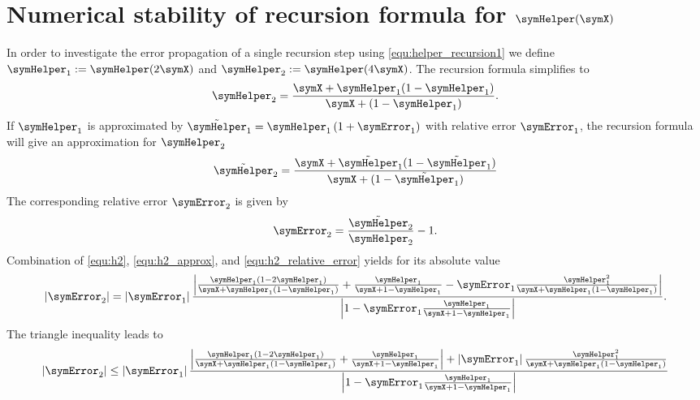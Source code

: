 \documentclass[a4paper]{scrartcl}
\begin{document}
\section{Numerical stability of recursion formula for $\symHelper(\symX)$}
\label{app:helper_stable}
In order to investigate the error propagation of a single recursion step using \eqref{equ:helper_recursion1} we define $\symHelper_1 := \symHelper(2\symX)$ and $\symHelper_2 := \symHelper(4\symX)$. The recursion formula simplifies to
\begin{equation}
\label{equ:h2}
\symHelper_2 = \frac{\symX+\symHelper_1(1-\symHelper_1)}{\symX+(1-\symHelper_1)}.
\end{equation}
If $\symHelper_1$ is approximated by $\tilde{\symHelper}_1 = \symHelper_1\left(1+\symError_1\right)$ with relative error $\symError_1$, the recursion formula will give an approximation for $\symHelper_2$
\begin{equation}
\label{equ:h2_approx}
\tilde{\symHelper}_2 = 
\frac{\symX+\tilde{\symHelper}_1(1-\tilde{\symHelper}_1)}{\symX+(1-\tilde{\symHelper}_1)}
\end{equation}
The corresponding relative error $\symError_2$ is given by
\begin{equation}
\label{equ:h2_relative_error}
\symError_2 = \frac{\tilde{\symHelper}_2}{\symHelper_2}-1.
\end{equation}
Combination of \eqref{equ:h2}, \eqref{equ:h2_approx}, and \eqref{equ:h2_relative_error} yields for its absolute value
\begin{equation}
\left|\symError_2\right|
=
\left|\symError_1\right|
\frac{
\left|
\frac{\symHelper_1\left(1-2\symHelper_1\right)}{\symX+\symHelper_1\left(1-\symHelper_1\right)}
+
\frac{\symHelper_1}{\symX+1-\symHelper_1}
-
\symError_1
\frac{\symHelper_1^2}{\symX+\symHelper_1\left(1-\symHelper_1\right)}
\right|
}{
\left|
1-
\symError_1
\frac{\symHelper_1}{\symX+1-\symHelper_1}
\right|
}.
\end{equation}
The triangle inequality leads to
\begin{equation}
\left|\symError_2\right|
\leq
\left|\symError_1\right|
\frac{
\left|
\frac{\symHelper_1\left(1-2\symHelper_1\right)}{\symX+\symHelper_1\left(1-\symHelper_1\right)}
+
\frac{\symHelper_1}{\symX+1-\symHelper_1}
\right|
+
\left|
\symError_1
\right|
\frac{\symHelper_1^2}{\symX+\symHelper_1\left(1-\symHelper_1\right)}
}{
\left|
1-
\symError_1
\frac{\symHelper_1}{\symX+1-\symHelper_1}
\right|
}
\end{equation}
\end{document}
